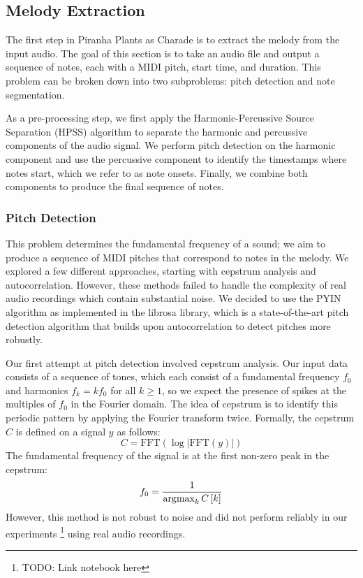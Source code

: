 \subsection{Melody Extraction}
\label{sec:melody_extraction}

The first step in Piranha Plants as Charade is to extract the melody from the input audio. The goal of this section is to take an audio file and output a sequence of notes, each with a MIDI pitch, start time, and duration. This problem can be broken down into two subproblems: pitch detection and note segmentation.

As a pre-processing step, we first apply the Harmonic-Percussive Source Separation (HPSS) algorithm \autocite{HPSS:2010,HPSS:2014} to separate the harmonic and percussive components of the audio signal. We perform pitch detection on the harmonic component and use the percussive component to identify the timestamps where notes start, which we refer to as note onsets. Finally, we combine both components to produce the final sequence of notes.

\subsubsection{Pitch Detection}

This problem determines the fundamental frequency of a sound; we aim to produce a sequence of MIDI pitches that correspond to notes in the melody. We explored a few different approaches, starting with cepstrum analysis and autocorrelation. However, these methods failed to handle the complexity of real audio recordings which contain substantial noise. We decided to use the PYIN algorithm as implemented in the librosa library, which is a state-of-the-art pitch detection algorithm that builds upon autocorrelation to detect pitches more robustly.


Our first attempt at pitch detection involved cepstrum analysis. Our input data consists of a sequence of tones, which each consist of a fundamental frequency $f_0$ and harmonics $f_k = k f_0$ for all $k \geq 1$, so we expect the presence of spikes at the multiples of $f_0$ in the Fourier domain. The idea of cepstrum is to identify this periodic pattern by applying the Fourier transform twice. Formally, the cepstrum $C$ is defined on a signal $y$ as follows:
$$C = \text{FFT}\left(\log\left|\text{FFT}\left(y\right)\right|\right)$$
The fundamental frequency of the signal is at the first non-zero peak in the cepstrum:
$$f_0 = \frac{1}{\operatorname*{\arg\!\max}_{k} C\left[k\right]}$$
However, this method is not robust to noise and did not perform reliably in our experiments \footnote{TODO: Link notebook here} using real audio recordings.


